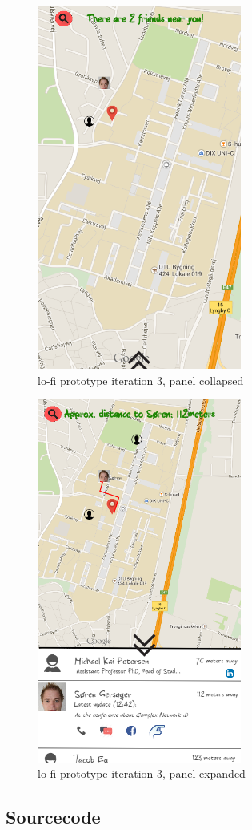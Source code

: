 \documentclass[runningheads,a4paper]{llncs}
\begin{document}
\begin{figure}
\centering
\caption{lo-fi prototype iteration 3, panel collapsed}
\includegraphics[width=0.6\textwidth]{figures/lo-fi-2}
\end{figure}

\begin{figure}
\centering
\caption{lo-fi prototype iteration 3, panel expanded}
\includegraphics[width=0.6\textwidth]{figures/lo-fi-1}
\end{figure}


\subsection*{Sourcecode}
\lstset{numbers=left,
tabsize=2, numbersep=10pt,
  title=\lstname }

\end{document}
